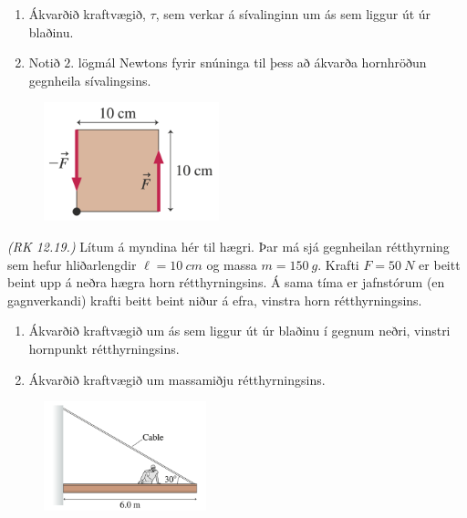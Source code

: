 \begin{enumerate}[label = \textbf{Dæmi \thechapter.\arabic*.}]
\begin{minipage}{\linewidth}
\begin{enumerate}[label = \textbf{(\alph*)}]
    \item Ákvarðið kraftvægið, $\tau$, sem verkar á sívalinginn um ás sem liggur út úr blaðinu.
    \item Notið $2.$ lögmál Newtons fyrir snúninga til þess að ákvarða hornhröðun gegnheila sívalingsins.
\end{enumerate}

\end{minipage}

\vspace{0.5cm}

\begin{minipage}{\linewidth}

\begin{figure}
\vspace{-0.755cm}
\includegraphics[width=2in]{images/torque2.png}
\end{figure}

\item \textit{(RK 12.19.)} Lítum á myndina hér til hægri. Þar má sjá gegnheilan rétthyrning sem hefur hliðarlengdir $\ell = \SI{10}{cm}$ og massa $m = \SI{150}{g}$. Krafti $F = \SI{50}{N}$ er beitt beint upp á neðra hægra horn rétthyrningsins. Á sama tíma er jafnstórum (en gagnverkandi) krafti beitt beint niður á efra, vinstra horn rétthyrningsins.

\begin{enumerate}[label = \textbf{(\alph*)}]
    \item Ákvarðið kraftvægið um ás sem liggur út úr blaðinu í gegnum neðri, vinstri hornpunkt rétthyrningsins.
    \item Ákvarðið kraftvægið um massamiðju rétthyrningsins.
\end{enumerate}

\end{minipage}

\vspace{0.5cm}

\begin{minipage}{\linewidth}

\begin{figure}
\vspace{-1cm}
\includegraphics[width=1.85in]{images/construct.png}
\end{figure}


\end{minipage}
\end{enumerate}
